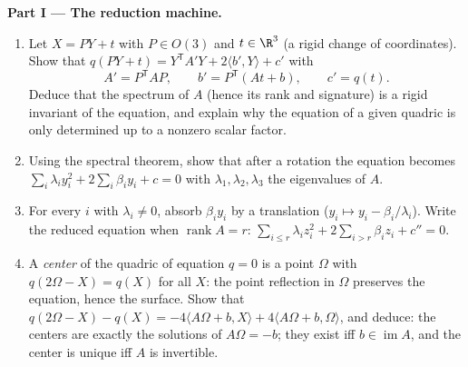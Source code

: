\begin{problem}
\medskip
\noindent\textbf{Part I --- The reduction machine.}
\begin{enumerate}
  \item Let $X = PY + t$ with $P \in O(3)$ and $t \in \R^3$ (a
        rigid change of coordinates). Show that $q(PY + t) =
        Y^{\mathsf T}\!A'Y + 2\langle b', Y\rangle + c'$ with
        \[
        A' = P^{\mathsf T}\!AP, \qquad
        b' = P^{\mathsf T}(At + b), \qquad
        c' = q(t) .
        \]
        Deduce that the spectrum of $A$ (hence its rank and
        signature) is a rigid invariant of the equation, and
        explain why the equation of a given quadric is only
        determined up to a nonzero scalar factor.
  \item Using the spectral theorem, show that after a rotation
        the equation becomes $\sum_i \lambda_i y_i^2 +
        2\sum_i\beta_iy_i + c = 0$ with $\lambda_1, \lambda_2,
        \lambda_3$ the eigenvalues of $A$.
  \item For every $i$ with $\lambda_i \neq 0$, absorb
        $\beta_iy_i$ by a translation ($y_i \mapsto y_i -
        \beta_i/\lambda_i$). Write the reduced equation when
        $\operatorname{rank} A = r$: $\sum_{i\leq r}\lambda_i
        z_i^2 + 2\sum_{i > r}\beta_iz_i + c'' = 0$.
  \item A \emph{center} of the quadric of equation $q = 0$ is
        a point $\Omega$ with $q(2\Omega - X) = q(X)$ for all
        $X$: the point reflection in $\Omega$ preserves the
        equation, hence the surface. Show that $q(2\Omega - X)
        - q(X) = -4\langle A\Omega + b, X\rangle + 4\langle
        A\Omega + b, \Omega\rangle$, and deduce: the centers
        are exactly the solutions of $A\Omega = -b$; they
        exist iff $b \in \operatorname{im}A$, and the center
        is unique iff $A$ is invertible.
\end{enumerate}


\end{problem}
